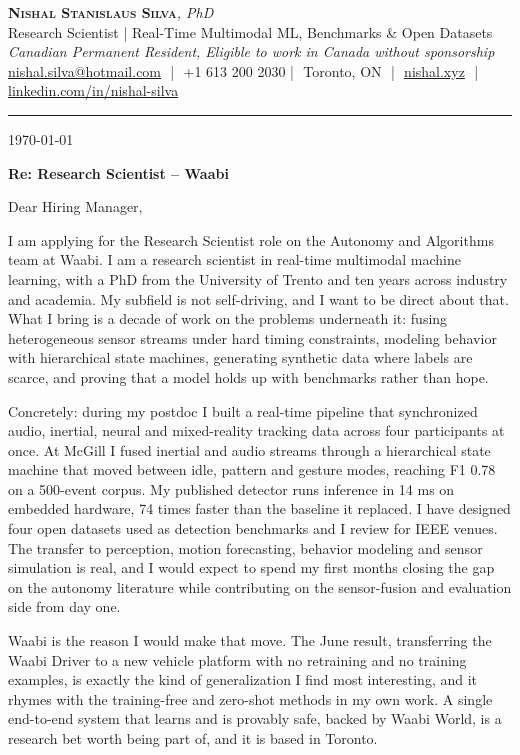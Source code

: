 \documentclass[11pt]{article}
\makeatletter
\newcommand{\clName}{Nishal Stanislaus Silva}
\newcommand{\clEmail}{nishal.silva@hotmail.com}
\newcommand{\clPhone}{+1 613 200 2030}
\newcommand{\clCity}{Toronto, ON}
\newcommand{\clSite}{https://nishal.xyz}
\newcommand{\clLinkedIn}{https://www.linkedin.com/in/nishal-silva}
\newcommand{\clStatus}{Canadian Permanent Resident, Eligible to work in Canada without sponsorship}
\newcommand{\clTagline}{Research Scientist | Real-Time Multimodal ML, Benchmarks \& Open Datasets}
\newcommand{\clRole}{Research Scientist}
\newcommand{\clCompany}{Waabi}
\newcommand{\clAddressee}{Dear Hiring Manager,}
\makeatother
\begin{document}
\pagestyle{empty}
\begin{center}
    {\LARGE \scshape \textbf{\clName}}{\large \textit{, PhD}}\\[1pt]
    {\small \clTagline}\\[1pt]
    {\footnotesize\textit{\clStatus}}\\[1pt]
    {\small
    \href{mailto:\clEmail}{\clEmail} \,\,|\,\, \clPhone \,\,|\,\, \clCity
    \,\,|\,\, \href{\clSite}{nishal.xyz} \,\,|\,\, \href{\clLinkedIn}{linkedin.com/in/nishal-silva}}
\end{center}

\rule{\linewidth}{0.4pt}\vspace{0.6em}

\today

\textbf{Re: \clRole{} -- \clCompany{}}

\clAddressee

I am applying for the Research Scientist role on the Autonomy and Algorithms team at Waabi. I am a research scientist in real-time multimodal machine learning, with a PhD from the University of Trento and ten years across industry and academia. My subfield is not self-driving, and I want to be direct about that. What I bring is a decade of work on the problems underneath it: fusing heterogeneous sensor streams under hard timing constraints, modeling behavior with hierarchical state machines, generating synthetic data where labels are scarce, and proving that a model holds up with benchmarks rather than hope.

Concretely: during my postdoc I built a real-time pipeline that synchronized audio, inertial, neural and mixed-reality tracking data across four participants at once. At McGill I fused inertial and audio streams through a hierarchical state machine that moved between idle, pattern and gesture modes, reaching F1 0.78 on a 500-event corpus. My published detector runs inference in 14 ms on embedded hardware, 74 times faster than the baseline it replaced. I have designed four open datasets used as detection benchmarks and I review for IEEE venues. The transfer to perception, motion forecasting, behavior modeling and sensor simulation is real, and I would expect to spend my first months closing the gap on the autonomy literature while contributing on the sensor-fusion and evaluation side from day one.

Waabi is the reason I would make that move. The June result, transferring the Waabi Driver to a new vehicle platform with no retraining and no training examples, is exactly the kind of generalization I find most interesting, and it rhymes with the training-free and zero-shot methods in my own work. A single end-to-end system that learns and is provably safe, backed by Waabi World, is a research bet worth being part of, and it is based in Toronto.
\end{document}
